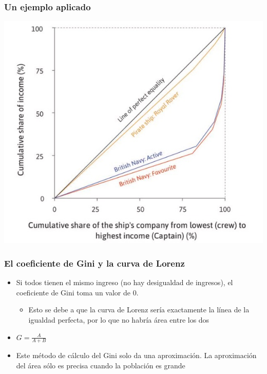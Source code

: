 \documentclass{beamer}
\begin{document}
\begin{frame} 
\frametitle{Un ejemplo aplicado}
    \begin{center}    
    \includegraphics[scale=0.55]{Slides Principios de Economia/Tema_04.17_lorenz2.jpg}
    \end{center}
\end{frame}

\begin{frame} 
\frametitle{El coeficiente de Gini y la curva de Lorenz}
\begin{itemize}
\item Si todos tienen el mismo ingreso (no hay desigualdad de ingresos), el coeficiente de Gini toma un valor de 0. 
\begin{itemize}
    \item Esto se debe a que la curva de Lorenz sería exactamente la línea de la igualdad perfecta, por lo que no habría área entre los dos
\end{itemize}
\item $G=\frac{A}{A+B}$
\item Este método de cálculo del Gini solo da una aproximación. La aproximación del área sólo es precisa cuando la población es grande
\end{itemize}
\end{frame}
\end{document}
